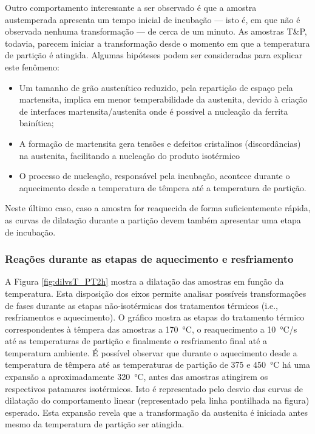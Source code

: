 Outro comportamento interessante a ser observado é que a amostra austemperada apresenta um tempo inicial de incubação --- isto é, em que não é observada nenhuma transformação --- de cerca de um minuto. As amostras T\&P, todavia, parecem iniciar a transformação desde o momento em que a temperatura de partição é atingida. Algumas hipóteses podem ser consideradas para explicar este fenômeno: 

\begin{itemize}
  \item Um tamanho de grão austenítico reduzido, pela repartição de espaço pela martensita, implica em menor temperabilidade da austenita, devido à criação de interfaces martensita/austenita onde é possível a nucleação da ferrita bainítica;
  \item A formação de martensita gera tensões e defeitos cristalinos (discordâncias) na austenita, facilitando a nucleação do produto isotérmico
  \item O processo de nucleação, responsável pela incubação, acontece durante o aquecimento desde a temperatura de têmpera até a temperatura de partição.
\end{itemize}

Neste último caso, caso a amostra for reaquecida de forma suficientemente rápida, as curvas de dilatação durante a partição devem também apresentar uma etapa de incubação.

\subsubsection{Reações durante as etapas de aquecimento e resfriamento}

A Figura \ref{fig:dilvsT_PT2h} mostra a dilatação das amostras em função da temperatura. Esta disposição dos eixos permite analisar possíveis transformações de fases durante as etapas não-isotérmicas dos tratamentos térmicos (i.e., resfriamentos e aquecimento). O gráfico mostra as etapas do tratamento térmico correspondentes à têmpera das amostras a \SI{170}{\degreeCelsius}, o reaquecimento a \SI{10}{\degreeCelsius/s} até as temperaturas de partição e finalmente o resfriamento final até a temperatura ambiente. É possível observar que durante o aquecimento desde a temperatura de têmpera até as temperaturas de partição de 375 e \SI{450}{\degreeCelsius} há uma expansão a aproximadamente \SI{320}{\degreeCelsius}, antes das amostras atingirem os respectivos patamares isotérmicos. Isto é representado pelo desvio das curvas de dilatação do comportamento linear (representado pela linha pontilhada na figura) esperado. Esta expansão revela que a transformação da austenita é iniciada antes mesmo da temperatura de partição ser atingida.

